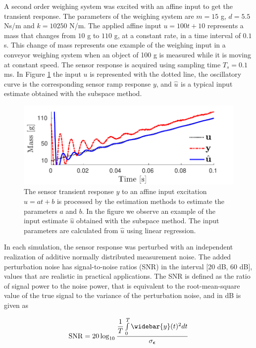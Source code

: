 A second order weighing system was excited with an affine input to get the transient response.
The parameters of the weighing system are $m = 15$ g, $d = 5.5$ Ns/m and $k = 10250$ N/m.
The applied affine input $u = 100 t + 10$ represents a mass that changes from $10$ g to $110$ g, at a constant rate, in a time interval of $0.1$ s.
This change of mass represents one example of the weighing input in a conveyor weighing system when an object of 100 g is measured while it is moving at constant speed.
The sensor response is acquired using sampling time $T_s = 0.1$ ms.
In Figure \ref{fig:sensor_weight} the input $u$ is represented with the dotted line, the oscillatory curve is the corresponding sensor ramp response $y$, and $\widehat{u}_{\mathrm{}}$ is a typical input estimate obtained with the subspace method.


\begin{figure}[!htbp]
\centering
\includegraphics[width=\columnwidth]{./ChapterRampInput/fig/Fig_2.pdf} 
\caption{ \label{fig:sensor_weight} The sensor transient response $y$ to an affine input excitation $u = at+b$ is processed by the estimation methods to estimate the parameters $a$ and $b$. In the figure we observe an example of the input estimate $\widehat{u}$ obtained with the subspace method. The input parameters are calculated from $\widehat{u}$ using linear regression.}
\end{figure}

In each simulation, the sensor response was perturbed with an independent realization of additive normally distributed measurement noise.
The added perturbation noise has signal-to-noise ratios (SNR) in the interval [20 dB, 60 dB], values that are realistic in practical applications.
The SNR is defined as the ratio of signal power to the noise power, that is equivalent to the root-mean-square value of the true signal to the variance of the perturbation noise, and in dB is given as

\begin{equation} \mathrm{SNR} = 20 \log_{10}{\dfrac{\dfrac{1}{T}\int\limits_0^T{\widebar{y}(t)^2 d t}}{\sigma_{\bm{\epsilon}}}} \end{equation}  


